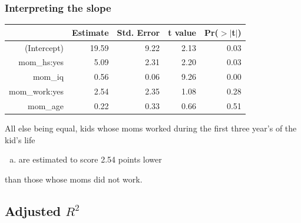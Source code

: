 
\begin{frame}
\frametitle{Interpreting the slope}


{\scriptsize
\begin{center}
\begin{tabular}{rrrrr}
  \hline
 & Estimate & Std. Error & t value & Pr($>$$|$t$|$) \\ 
  \hline
(Intercept) & 19.59 & 9.22 & 2.13 & 0.03 \\ 
  mom\_hs:yes & 5.09 & 2.31 & 2.20 & 0.03 \\ 
  mom\_iq & 0.56 & 0.06 & 9.26 & 0.00 \\ 
  mom\_work:yes & 2.54 & 2.35 & 1.08 & 0.28 \\ 
  mom\_age & 0.22 & 0.33 & 0.66 & 0.51 \\ 
   \hline
\end{tabular}
\end{center}
}

All else being equal, kids whose moms worked during the first three year's of the kid's life
\begin{enumerate}[(a)]
\item are estimated to score 2.54 points lower
\end{enumerate}
than those whose moms did not work.
 
\end{frame}


\subsection{Adjusted $R^2$}




